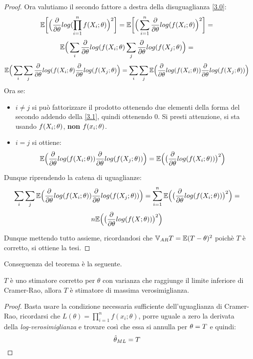 \begin{theorem}
\begin{proof}
Ora valutiamo il secondo fattore a destra della disuguaglianza \ref{3.0}:
\[\mathbb{E}\bigg[\Big(\frac{\partial}{\partial\theta}log(\prod_{i=1}^nf(X_i;\theta)\Big)^2\bigg]=\mathbb{E}\bigg[\Big(\sum\limits_{i=1}^n\frac{\partial}{\partial\theta}log(f(X_i;\theta)\Big)^2\bigg]=\]
\[\mathbb{E}\Big(\sum\limits_i\frac{\partial}{\partial\theta}log(f(X_i;\theta)\sum\limits_j\frac{\partial}{\partial\theta}log(f(X_j;\theta)\Big)=\]
\[\mathbb{E}\Big(\sum\limits_i\sum\limits_j\frac{\partial}{\partial\theta}log(f(X_i;\theta)\frac{\partial}{\partial\theta}log(f(X_j;\theta)\Big)=\sum\limits_i\sum\limits_j\mathbb{E}\Big(\frac{\partial}{\partial\theta}log(f(X_i;\theta))\frac{\partial}{\partial\theta}log(f(X_j;\theta))\Big)\]
\newpage
Ora se:
\begin{itemize}
    \item $i\neq j$ si può fattorizzare il prodotto ottenendo due elementi della forma del secondo addendo della \ref{3.1}, quindi ottenendo $0$. Si presti attenzione, si sta usando $f(X_i;\theta)$, \textbf{non} $f(x_i;\theta)$.
    \item $i=j$ si ottiene:
    \[\mathbb{E}\Big(\frac{\partial}{\partial\theta}log(f(X_i;\theta))\frac{\partial}{\partial\theta}log(f(X_j;\theta))\Big)=\mathbb{E}\Big(\big(\frac{\partial}{\partial\theta}log(f(X_i;\theta))\big)^2\Big)\]
\end{itemize}
Dunque riprendendo la catena di uguaglianze:
\[\sum\limits_i\sum\limits_j\mathbb{E}\Big(\frac{\partial}{\partial\theta}log(f(X_i;\theta))\frac{\partial}{\partial\theta}log(f(X_j;\theta))\Big)=\sum\limits_{i=1}^n\mathbb{E}\Big(\big(\frac{\partial}{\partial\theta}log(f(X_i;\theta))\big)^2\Big)=\]
\[n\mathbb{E}\Big(\big(\frac{\partial}{\partial\theta}log(f(X;\theta))\big)^2\Big)\]

Dunque mettendo tutto assieme, ricordandosi che $\mathbb{V}_{AR} T=\mathbb{E}(T-\theta)^2$ poichè $T$ è corretto, si ottiene la tesi.
\end{proof}
\end{theorem}

\vspace{15px}

Conseguenza del teorema è la seguente.
\begin{proposition}
$T$ è uno stimatore corretto per $\theta$ con varianza che raggiunge il limite inferiore di Cramer-Rao, allora $T$ è stimatore di massima verosimiglianza.
\begin{proof}
Basta usare la condizione necessaria sufficiente dell'uguaglianza di Cramer-Rao, ricordarsi che $L(\theta)=\prod_{i=1}^nf(x_i;\theta)$, porre uguale a zero la derivata della \textit{log-verosimiglianza} e trovare così che essa si annulla per $\theta=T$ e quindi:
\[\hat{\theta}_{ML}=T\]
\end{proof}
\end{proposition}